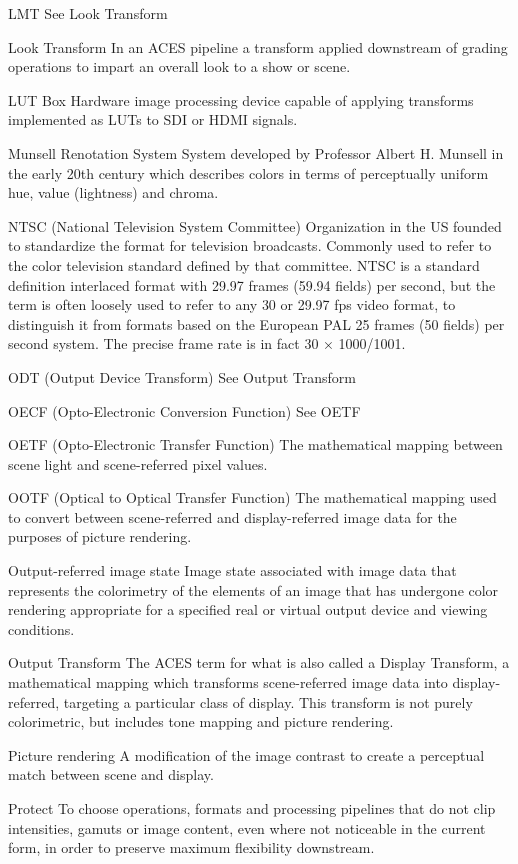 LMT 
See Look Transform 

Look Transform
In an ACES pipeline a transform applied downstream of grading operations to impart an overall look to a show or scene.

LUT Box
Hardware image processing device capable of applying transforms implemented as LUTs to SDI or HDMI signals.

Munsell Renotation System
System developed by Professor Albert H. Munsell in the early 20th century which describes colors in terms of perceptually uniform hue, value (lightness) and chroma.

NTSC (National Television System Committee)
Organization in the US founded to standardize the format for television broadcasts. Commonly used to refer to the color television standard defined by that committee. NTSC is a standard definition interlaced format with 29.97 frames (59.94 fields) per second, but the term is often loosely used to refer to any 30 or 29.97 fps video format, to distinguish it from formats based on the European PAL 25 frames (50 fields) per second system. The precise frame rate is in fact 30 × 1000/1001.

ODT (Output Device Transform) 
See Output Transform

OECF (Opto-Electronic Conversion Function) 
See OETF

OETF (Opto-Electronic Transfer Function)
The mathematical mapping between scene light and scene-referred pixel values.

OOTF (Optical to Optical Transfer Function)
The mathematical mapping used to convert between scene-referred and display-referred image data for the purposes of picture rendering.

Output-referred image state
Image state associated with image data that represents the colorimetry of the elements of an image that has undergone color rendering appropriate for a specified real or virtual output device and viewing conditions.

Output Transform
The ACES term for what is also called a Display Transform, a mathematical mapping which transforms scene-referred image data into display-referred, targeting a particular class of display. This transform is not purely colorimetric, but includes tone mapping and picture rendering.

Picture rendering
A modification of the image contrast to create a perceptual match between scene and display.

Protect
To choose operations, formats and processing pipelines that do not clip intensities, gamuts or image content, even where not noticeable in the current form, in order to preserve maximum flexibility downstream.

